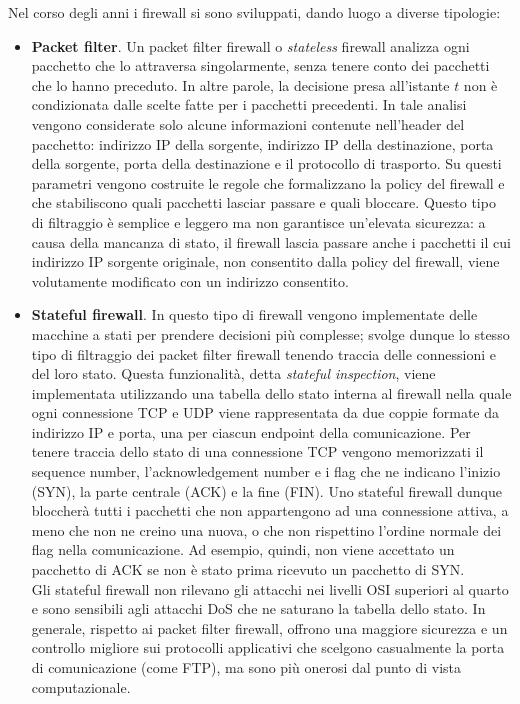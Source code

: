 Nel corso degli anni i firewall si sono sviluppati, dando luogo a diverse tipologie:
\begin{itemize}
	\item \textbf{Packet filter}. Un packet filter firewall o \textit{stateless} firewall analizza ogni pacchetto che lo attraversa singolarmente, senza tenere conto dei pacchetti che lo hanno preceduto. In altre parole, la decisione presa all'istante $t$ non è condizionata dalle scelte fatte per i pacchetti precedenti. In tale analisi vengono considerate solo alcune informazioni contenute nell'header del pacchetto: indirizzo IP della sorgente, indirizzo IP della destinazione, porta della sorgente, porta della destinazione e il protocollo di trasporto. Su questi parametri vengono costruite le regole che formalizzano la policy del firewall e che stabiliscono quali pacchetti lasciar passare e quali bloccare. Questo tipo di filtraggio è semplice e leggero ma non garantisce un'elevata sicurezza: a causa della mancanza di stato, il firewall lascia passare anche i pacchetti il cui indirizzo IP sorgente originale, non consentito dalla policy del firewall, viene volutamente modificato con un indirizzo consentito.
	\item \textbf{Stateful firewall}. In questo tipo di firewall vengono implementate delle macchine a stati per prendere decisioni più complesse; svolge dunque lo stesso tipo di filtraggio dei packet filter firewall tenendo traccia delle connessioni e del loro stato.  Questa funzionalità, detta \textit{stateful inspection}, viene implementata utilizzando una tabella dello stato interna al firewall nella quale ogni connessione TCP e UDP viene rappresentata da due coppie formate da indirizzo IP e porta, una per ciascun endpoint della comunicazione. Per tenere traccia dello stato di una connessione TCP vengono memorizzati il sequence number, l'acknowledgement number e i flag che ne indicano l'inizio (SYN), la parte centrale (ACK) e la fine (FIN).  Uno stateful firewall dunque bloccherà tutti i pacchetti che non appartengono ad una connessione attiva, a meno che non ne creino una nuova, o che non rispettino l'ordine normale dei flag nella comunicazione. Ad esempio, quindi, non viene accettato un pacchetto di ACK se non è stato prima ricevuto un pacchetto di SYN.\\
	Gli stateful firewall non rilevano gli attacchi nei livelli OSI superiori al quarto e sono sensibili agli attacchi DoS che ne saturano la tabella dello stato. In generale, rispetto ai packet filter firewall, offrono una maggiore sicurezza e un controllo migliore sui protocolli applicativi che scelgono casualmente la porta di comunicazione (come FTP), ma sono più onerosi dal punto di vista computazionale.

\end{itemize}
